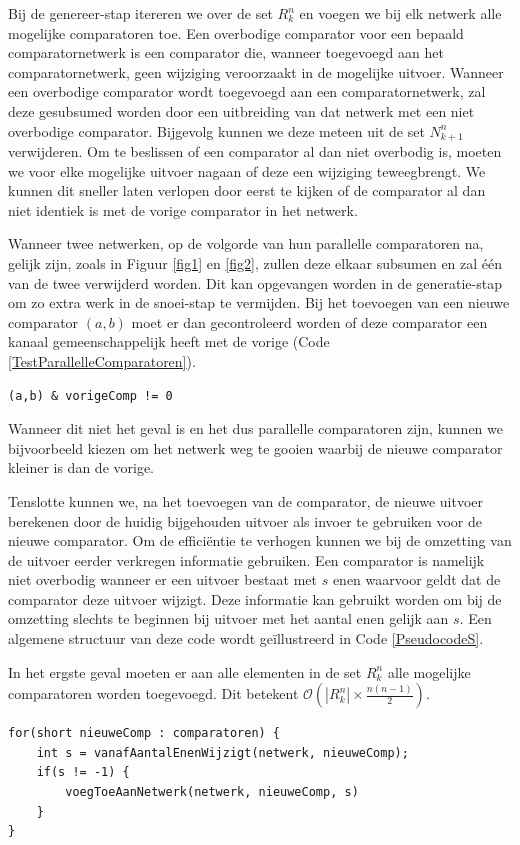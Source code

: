 \documentclass{article}
\begin{document}
Bij de genereer-stap itereren we over de set $R^n_k$ en voegen we bij elk netwerk alle mogelijke comparatoren toe.
Een overbodige comparator voor een bepaald comparatornetwerk is een comparator die, wanneer toegevoegd aan het comparatornetwerk, geen wijziging veroorzaakt in de mogelijke uitvoer.
Wanneer een overbodige comparator wordt toegevoegd aan een comparatornetwerk, zal deze gesubsumed worden door een uitbreiding van dat netwerk met een niet overbodige comparator.
Bijgevolg kunnen we deze meteen uit de set $N^n_{k+1}$ verwijderen. 
Om te beslissen of een comparator al dan niet overbodig is, moeten we voor elke mogelijke uitvoer nagaan of deze een wijziging teweegbrengt.
We kunnen dit sneller laten verlopen door eerst te kijken of de comparator al dan niet identiek is met de vorige comparator in het netwerk.

Wanneer twee netwerken, op de volgorde van hun parallelle comparatoren na, gelijk zijn, zoals in Figuur \ref{fig1} en \ref{fig2}, zullen deze elkaar subsumen en zal \'e\'en van de twee verwijderd worden.
Dit kan opgevangen worden in de generatie-stap om zo extra werk in de snoei-stap te vermijden.
Bij het toevoegen van een nieuwe comparator $(a,b)$ moet er dan gecontroleerd worden of deze comparator een kanaal gemeenschappelijk heeft met de vorige (Code \ref{TestParallelleComparatoren}).
\begin{lstlisting}[caption={Test op parallelle comparatoren.},label=TestParallelleComparatoren]
(a,b) & vorigeComp != 0
\end{lstlisting}
Wanneer dit niet het geval is en het dus parallelle comparatoren zijn, kunnen we bijvoorbeeld kiezen om het netwerk weg te gooien waarbij de nieuwe comparator kleiner is dan de vorige.

Tenslotte kunnen we, na het toevoegen van de comparator, de nieuwe uitvoer berekenen door de huidig bijgehouden uitvoer als invoer te gebruiken voor de nieuwe comparator.
Om de effici\"entie te verhogen kunnen we bij de omzetting van de uitvoer eerder verkregen informatie gebruiken.
Een comparator is namelijk niet overbodig wanneer er een uitvoer bestaat met $s$ enen waarvoor geldt dat de comparator deze uitvoer wijzigt.
Deze informatie kan gebruikt worden om bij de omzetting slechts te beginnen bij uitvoer met het aantal enen gelijk aan $s$.
Een algemene structuur van deze code wordt ge\"illustreerd in Code \ref{PseudocodeS}.

In het ergste geval moeten er aan alle elementen in de set $R^n_k$ alle mogelijke comparatoren worden toegevoegd.
Dit betekent $\mathcal{O}\left(|R^n_k|\times \frac{n(n-1)}{2} \right)$.
\begin{lstlisting}[caption={Pseudocode - optimalisatie via $s$}, label=PseudocodeS]
for(short nieuweComp : comparatoren) {
	int s = vanafAantalEnenWijzigt(netwerk, nieuweComp);
	if(s != -1) {
		voegToeAanNetwerk(netwerk, nieuweComp, s)
	}
}
\end{lstlisting}
\end{document}
